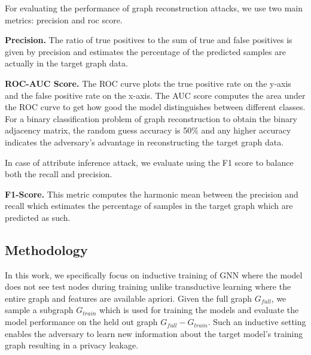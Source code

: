 \noindent For evaluating the performance of graph reconstruction attacks, we use two main metrics: precision and roc score.

\noindent\textbf{Precision.} The ratio of true positives to the sum of true and false positives is given by precision and estimates the percentage of the predicted samples are actually in the target graph data.

\noindent\textbf{ROC-AUC Score.} The ROC curve plots the true positive rate on the y-axis and the false positive rate on the x-axis. The AUC score computes the area under the ROC curve to get how good the model distinguishes between different classes.
For a binary classification problem of graph reconstruction to obtain the binary adjacency matrix, the random guess accuracy is 50\% and any higher accuracy indicates the adversary's advantage in reconstructing the target graph data.


\noindent In case of attribute inference attack, we evaluate using the F1 score to balance both the recall and precision.

\noindent\textbf{F1-Score.} This metric computes the harmonic mean between the precision and recall which estimates the percentage of samples in the target graph which are predicted as such.

\subsection{Methodology}

In this work, we specifically focus on inductive training of GNN where the model does not see test nodes during training unlike transductive learning where the entire graph and features are available apriori.
Given the full graph $G_{full}$, we sample a subgraph $G_{train}$ which is used for training the models and evaluate the model performance on the held out graph $G_{full}-G_{train}$.
Such an inductive setting enables the adversary to learn new information about the target model's training graph resulting in a privacy leakage.

